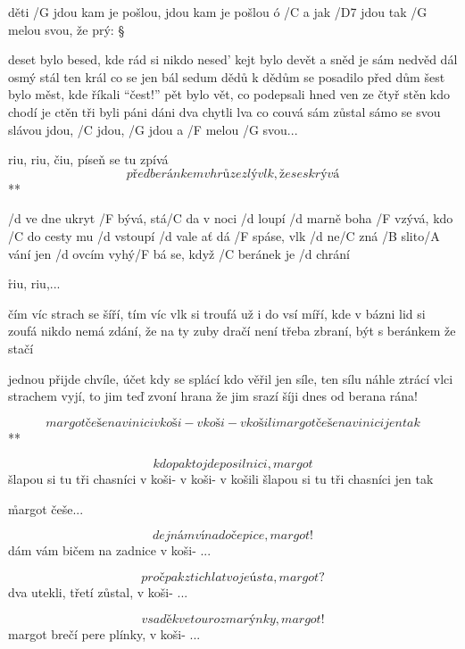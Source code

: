 
děti /G jdou kam je pošlou, jdou kam je pošlou ó
/C a jak /D7 jdou tak /G melou svou, že prý: \S

deset bylo besed, kde rád si nikdo nesed'
kejt bylo devět a sněd je sám nedvěd
dál osmý stál ten král co se jen bál
sedum dědů k dědům se posadilo před dům
šest bylo měst, kde říkali ``čest!''
pět bylo vět, co podepsali hned
ven ze čtyř stěn kdo chodí je ctěn
tři byli páni dáni
dva chytli lva co couvá
sám zůstal sámo se svou slávou
jdou, /C jdou, /G jdou a /F melou /G svou...





\R riu, riu, čiu, píseň se tu zpívá
   \[ před beránkem v hrůze zlý vlk, že se skrývá \] **

/d ve dne ukryt /F bývá, stá/C da v noci /d loupí
/d marně boha /F vzývá, kdo /C do cesty mu /d vstoupí
/d vale ať dá /F spáse, vlk /d ne/C zná /B slito/A vání
jen /d ovcím vyhý/F bá se, když /C beránek je /d chrání

\r riu, riu,...

čím víc strach se šíří, tím víc vlk si troufá
už i do vsí míří, kde v bázni lid si zoufá
nikdo nemá zdání, že na ty zuby dračí
není třeba zbraní, být s beránkem že stačí

\rr

jednou přijde chvíle, účet kdy se splácí
kdo věřil jen síle, ten sílu náhle ztrácí
vlci strachem vyjí, to jim teď zvoní hrana
že jim srazí šíji dnes od berana rána!




\R \[ margot češe na vinici v koši- v koši- v košili
    margot češe na vinici jen tak \] **

\[ kdopak to jde po silnici, margot \]
šlapou si tu tři chasníci v koši- v koši- v košili
šlapou si tu tři chasníci jen tak \s

\r margot češe...

\[ dej nám vína do čepice, margot! \]
dám vám bičem na zadnice v koši- ... \s

\rr

\[ pročpak ztichla tvoje ústa, margot? \]
dva utekli, třetí zůstal, v koši- ... \s

\rr

\[ v sadě kvetou rozmarýnky, margot! \]
margot brečí pere plínky, v koši- ...




